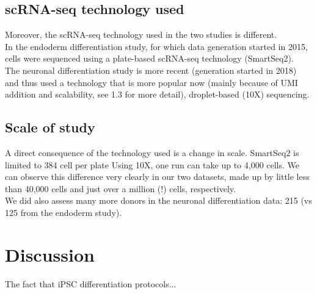 \subsection{scRNA-seq technology used}

Moreover, the scRNA-seq technology used in the two studies is different.\\

In the endoderm differentiation study, for which data generation started in 2015, cells were sequenced using a plate-based scRNA-seq technology (SmartSeq2).\\

The neuronal differentiation study is more recent (generation started in 2018) and thus used a technology that is more popular now (mainly because of UMI addition and scalability, see 1.3 for more detail), droplet-based (10X) sequencing.

\subsection{Scale of study}
A direct consequence of the technology used is a change in scale.
SmartSeq2 is limited to 384 cell per plate
Using 10X, one run can take up to 4,000 cells.
We can observe this difference very clearly in our two datasets, made up by little less than 40,000 cells and just over a million (!) cells, respectively.\\

We did also assess many more donors in the neuronal differentiation data: 215 (vs 125 from the endoderm study).

\section{Discussion}

The fact that iPSC differentiation protocols...